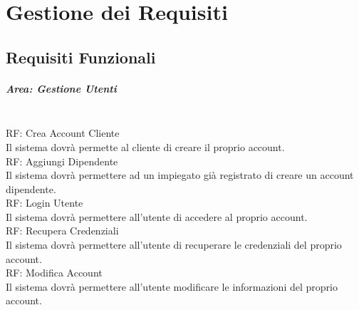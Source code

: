 \chapter{Gestione dei Requisiti}
\label{ch:GestioneDeiRequisiti}
\section{Requisiti Funzionali}
\label{sec:RequisitiFunzionali}

\setcounter{contrequisiti}{1}

\paragraph{Area: Gestione Utenti}\mbox{}\\
RF\thecontrequisiti: Crea Account Cliente\\
Il sistema dovrà permette al cliente di creare il proprio account.\vspace{10px} \\ 
RF\thecontrequisiti: Aggiungi Dipendente\\
Il sistema dovrà permettere ad un impiegato già registrato di creare un account dipendente.\vspace{10px} \\ 
RF\thecontrequisiti: Login Utente\\
Il sistema dovrà permettere all'utente di accedere al proprio account.\vspace{10px} \\ 
RF\thecontrequisiti: Recupera Credenziali\\
Il sistema dovrà permettere all'utente di recuperare le credenziali del proprio account.\vspace{10px} \\ 
RF\thecontrequisiti: Modifica Account\\
Il sistema dovrà permettere all'utente modificare le informazioni del proprio account.\vspace{10px} \\ 

